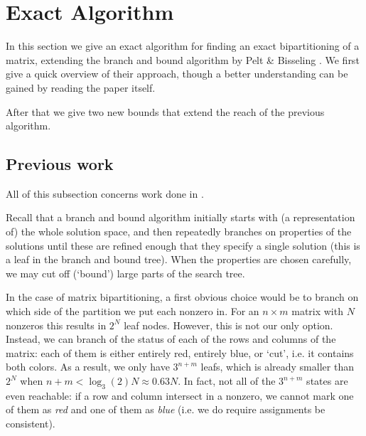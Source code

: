	\section{Exact Algorithm}
	\label{sec:opt}

	In this section we give an exact algorithm for finding an exact
	bipartitioning of a matrix, extending the branch and bound
	algorithm by Pelt \&
	Bisseling \cite{pelt15}. We first give a quick overview
	of their approach, though
	a better understanding can be gained by reading the
	paper itself.

	After that we give two new bounds that extend the reach of the previous
	algorithm.

	\subsection{Previous work}

	All of this subsection concerns work done in \cite{pelt15}.

	Recall that a branch and bound algorithm initially starts with
	(a representation of) the whole solution space, and then repeatedly
	branches on properties of the solutions until these are refined
	enough that they specify a single solution (this is a leaf in the branch
	and bound tree). When the properties are
	chosen carefully, we may cut off (`bound') large parts of the search
	tree.

	In the case of matrix bipartitioning, a first obvious choice would 
	be to branch on
	which side of the partition we put each nonzero in. For an $n \times m$
	matrix with $N$ nonzeros this results in $2^N$ leaf nodes. However,
	this is not our only option.
	Instead, we can branch of the status of each of the
	rows and columns of the matrix: each of them is either entirely red,
	entirely blue, or `cut', i.e. it contains both colors. As a result, we
	only have $3^{n+m}$ leafs, which is already smaller than $2^N$ when
	$n + m < \log_3(2) N \approx 0.63N$. In fact, not all of the $3^{n+m}$
	states are even reachable: if a row and column intersect in a nonzero,
	we cannot mark one of them as \textit{red} and one of them as \textit{blue}
	(i.e. we do require assignments be consistent).

